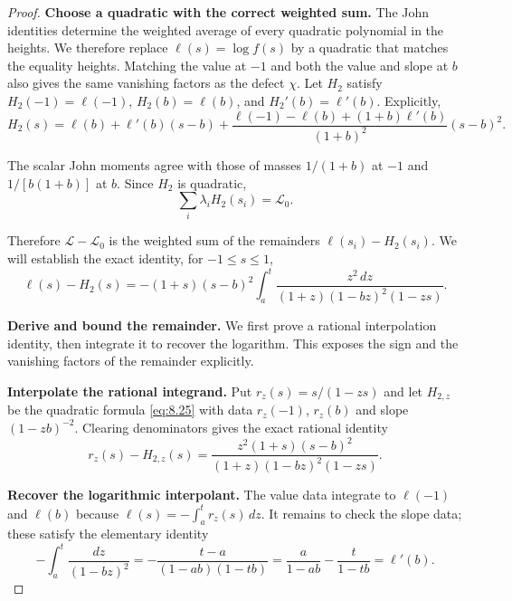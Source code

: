 \begin{proof}
\textbf{Choose a quadratic with the correct weighted sum.} The John identities determine
the weighted average of every quadratic polynomial in the heights. We therefore
replace $\ell(s)=\log f(s)$ by a quadratic that matches the equality heights.
Matching the value at $-1$ and both the value and slope at $b$ also gives the
same vanishing factors as the defect $\chi$. Let $H_2$ satisfy
$H_2(-1)=\ell(-1)$, $H_2(b)=\ell(b)$, and $H_2'(b)=\ell'(b)$. Explicitly,
\begin{equation}\label{eq:8.25}
H_2(s)=\ell(b)+\ell'(b)(s-b)
+\frac{\ell(-1)-\ell(b)+(1+b)\ell'(b)}{(1+b)^2}(s-b)^2.
\end{equation}

The scalar John moments agree with those of masses $1/(1+b)$ at $-1$ and $1/[b(1+b)]$ at $b$. Since $H_2$ is quadratic,
\begin{equation}\label{eq:8.26}
\sum_i\lambda_iH_2(s_i)=\mathcal L_0.
\end{equation}

Therefore $\mathcal L-\mathcal L_0$ is the weighted sum of the remainders
$\ell(s_i)-H_2(s_i)$. We will establish the exact identity, for $-1\le s\le1$,
\begin{equation}\label{eq:8.27}
\ell(s)-H_2(s)=-(1+s)(s-b)^2
\int_a^t\frac{z^2\,dz}{(1+z)(1-bz)^2(1-zs)}.
\end{equation}

\textbf{Derive and bound the remainder.} We first prove a rational interpolation identity, then integrate
it to recover the logarithm. This exposes the sign and the vanishing factors
of the remainder explicitly.

\textbf{Interpolate the rational integrand.} Put $r_z(s)=s/(1-zs)$ and let
$H_{2,z}$ be the quadratic formula \eqref{eq:8.25} with data $r_z(-1)$, $r_z(b)$
and slope $(1-zb)^{-2}$. Clearing denominators gives the exact rational identity
\begin{equation}\label{eq:8.28}
r_z(s)-H_{2,z}(s)
=\frac{z^2(1+s)(s-b)^2}{(1+z)(1-bz)^2(1-zs)}.
\end{equation}

\textbf{Recover the logarithmic interpolant.} The value data integrate to
$\ell(-1)$ and $\ell(b)$ because $\ell(s)=-\int_a^t r_z(s)\,dz$.
It remains to check the slope data; these satisfy the elementary identity
\begin{equation}\label{eq:8.29}
-\int_a^t\frac{dz}{(1-bz)^2}
=-\frac{t-a}{(1-ab)(1-tb)}
=\frac{a}{1-ab}-\frac{t}{1-tb}=\ell'(b).
\end{equation}


\end{proof}
